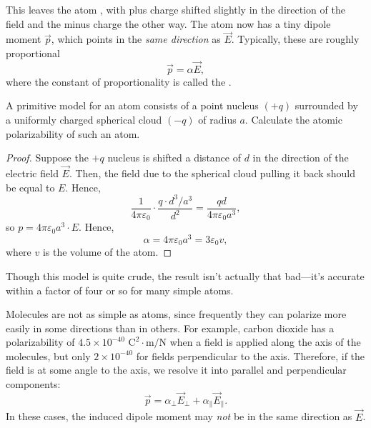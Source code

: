This leaves the atom , with plus charge shifted slightly in the direction of the field and the minus charge the other way. The atom now has a tiny dipole moment $\vec{p}$, which points in the \textit{same direction} as $\vec{E}$. Typically, these are roughly proportional
\[\vec{p}=\alpha\vec{E},\]
where the constant of proportionality is called the .

\begin{example}\label{primatompolar}
A primitive model for an atom consists of a point nucleus $(+q)$ surrounded by a uniformly charged spherical cloud $(-q)$ of radius $a$. Calculate the atomic polarizability of such an atom.
\end{example}

\begin{proof}
Suppose the $+q$ nucleus is shifted a distance of $d$ in the direction of the electric field $\vec{E}$. Then, the field due to the spherical cloud pulling it back should be equal to $E$. Hence,
\[\frac{1}{4\pi\varepsilon_0}\cdot \frac{q\cdot d^3/a^3}{d^2}=\frac{qd}{4\pi\varepsilon_0 a^3},\]
so $p=4\pi\varepsilon_0 a^3\cdot E$. Hence,
\[\alpha=4\pi\varepsilon_0a^3=3\varepsilon_0 v,\]
where $v$ is the volume of the atom.
\end{proof}

\begin{remark}
Though this model is quite crude, the result isn't actually that bad---it's accurate within a factor of four or so for many simple atoms.
\end{remark}

Molecules are not as simple as atoms, since frequently they can polarize more easily in some directions than in others. For example, carbon dioxide has a polarizability of $4.5\times 10^{-40} \text{ C}^2\cdot\text{m}/\text{N}$ when a field is applied along the axis of the molecules, but only $2\times 10^{-40}$ for fields perpendicular to the axis. Therefore, if the field is at some angle to the axis, we resolve it into parallel and perpendicular components:
\[\vec{p}=\alpha_\perp\vec{E}_\perp + \alpha_\parallel \vec{E}_\parallel.\]
In these cases, the induced dipole moment may \textit{not} be in the same direction as $\vec{E}$.

